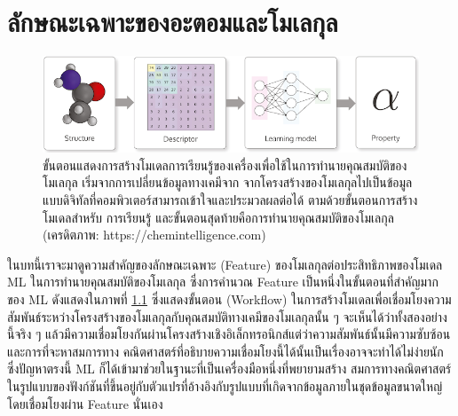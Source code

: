 

\chapter{ลักษณะเฉพาะของอะตอมและโมเลกุล}
\label{ch:feature}

\begin{figure}[htbp]
    \centering
    \includegraphics[width=\linewidth]{fig/workflow_chem_ml.png}
    \caption{ขั้นตอนแสดงการสร้างโมเดลการเรียนรู้ของเครื่องเพื่อใช้ในการทำนายคุณสมบัติของโมเลกุล เริ่มจากการเปลี่ยนข้อมูลทางเคมีจาก%
    จากโครงสร้างของโมเลกุลไปเป็นข้อมูลแบบดิจิทัลที่คอมพิวเตอร์สามารถเข้าใจและประมวลผลต่อได้ ตามด้วยขั้นตอนการสร้างโมเดลสำหรับ%
    การเรียนรู้ และขั้นตอนสุดท้ายคือการทำนายคุณสมบัติของโมเลกุล (เครดิตภาพ: https://chemintelligence.com)}
    \label{fig:workflow_chem_ml}
\end{figure}

ในบทนี้เราจะมาดูความสำคัญของลักษณะเฉพาะ (Feature) ของโมเลกุลต่อประสิทธิภาพของโมเดล ML ในการทำนายคุณสมบัติของโมเลกุล%
\autocite{yang2019a} ซึ่งการคำนวณ Feature เป็นหนึ่งในขั้นตอนที่สำคัญมากของ ML ดังแสดงในภาพที่ \ref{fig:workflow_chem_ml} 
ซึ่งแสดงขั้นตอน (Workflow) ในการสร้างโมเดลเพื่อเชื่อมโยงความสัมพันธ์ระหว่างโครงสร้างของโมเลกุลกับคุณสมบัติทางเคมีของโมเลกุลนั้น ๆ 
จะเห็นได้ว่าทั้งสองอย่างนี้จริง ๆ แล้วมีความเชื่อมโยงกันผ่านโครงสร้างเชิงอิเล็กทรอนิกส์แต่ว่าความสัมพันธ์นั้นมีความซับซ้อนและการที่จะหาสมการทาง%
คณิตศาสตร์ที่อธิบายความเชื่อมโยงนี้ได้นั้นเป็นเรื่องอาจจะทำได้ไม่ง่ายนัก ซึ่งปัญหาตรงนี้ ML ก็ได้เข้ามาช่วยในฐานะที่เป็นเครื่องมือหนึ่งที่พยายามสร้าง%
สมการทางคณิตศาสตร์ในรูปแบบของฟังก์ชันที่ขึ้นอยู่กับตัวแปรที่อ้างอิงกับรูปแบบที่เกิดจากข้อมูลภายในชุดข้อมูลขนาดใหญ่โดยเชื่อมโยงผ่าน Feature 
นั่นเอง

